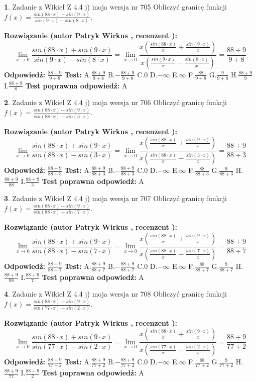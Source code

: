 \documentclass[12pt, a4paper]{article}
\theoremstyle{definition} %
\newtheorem{zad}{}
\newcommand{\zadStart}[1]{\begin{zad}#1\newline}
\newcommand{\zadStop}{\end{zad}}
\newcommand{\rozwStart}[2]{\noindent \textbf{Rozwiązanie (autor #1 , recenzent #2): }\newline}
\newcommand{\rozwStop}{\newline}
\newcommand{\odpStart}{\noindent \textbf{Odpowiedź:}\newline}
\newcommand{\odpStop}{\newline}
\newcommand{\testStart}{\noindent \textbf{Test:}\newline}
\newcommand{\testStop}{\newline}
\newcommand{\kluczStart}{\noindent \textbf{Test poprawna odpowiedź:}\newline}
\newcommand{\kluczStop}{\newline}
\begin{document}
\zadStart{Zadanie z Wikieł Z 4.4 j) moja wersja nr 705}
Obliczyć granicę funkcji $f(x)=\frac{sin(88\cdot x) +sin(9\cdot x)}{sin(9\cdot x) -sin(8\cdot x)}$.
\zadStop
\rozwStart{Patryk Wirkus}{}
$$\lim\limits_{x\to 0}\frac{sin(88\cdot x) +sin(9\cdot x)}{sin(9\cdot x) -sin(8\cdot x)}=\lim\limits_{x\to 0}\frac{x(\frac{sin(88\cdot x)}{x}+\frac{sin(9\cdot x)}{x})}{x(\frac{sin(9\cdot x)}{x}-\frac{sin(8\cdot x)}{x})}=\frac{88+9}{9+8}$$
\rozwStop
\odpStart
$\frac{88+9}{9+8}$
\odpStop
\testStart
A.$\frac{88+9}{9+8}$
B.$-\frac{88+9}{9+8}$
C.$0$
D.$-\infty$
E.$\infty$
F.$\frac{88}{9+8}$
G.$\frac{9}{9+8}$
H.$\frac{88+9}{9}$
I.$\frac{88+9}{8}$
\testStop
\kluczStart
A
\kluczStop



\zadStart{Zadanie z Wikieł Z 4.4 j) moja wersja nr 706}
Obliczyć granicę funkcji $f(x)=\frac{sin(88\cdot x) +sin(9\cdot x)}{sin(88\cdot x) -sin(3\cdot x)}$.
\zadStop
\rozwStart{Patryk Wirkus}{}
$$\lim\limits_{x\to 0}\frac{sin(88\cdot x) +sin(9\cdot x)}{sin(88\cdot x) -sin(3\cdot x)}=\lim\limits_{x\to 0}\frac{x(\frac{sin(88\cdot x)}{x}+\frac{sin(9\cdot x)}{x})}{x(\frac{sin(88\cdot x)}{x}-\frac{sin(3\cdot x)}{x})}=\frac{88+9}{88+3}$$
\rozwStop
\odpStart
$\frac{88+9}{88+3}$
\odpStop
\testStart
A.$\frac{88+9}{88+3}$
B.$-\frac{88+9}{88+3}$
C.$0$
D.$-\infty$
E.$\infty$
F.$\frac{88}{88+3}$
G.$\frac{9}{88+3}$
H.$\frac{88+9}{88}$
I.$\frac{88+9}{3}$
\testStop
\kluczStart
A
\kluczStop



\zadStart{Zadanie z Wikieł Z 4.4 j) moja wersja nr 707}
Obliczyć granicę funkcji $f(x)=\frac{sin(88\cdot x) +sin(9\cdot x)}{sin(88\cdot x) -sin(7\cdot x)}$.
\zadStop
\rozwStart{Patryk Wirkus}{}
$$\lim\limits_{x\to 0}\frac{sin(88\cdot x) +sin(9\cdot x)}{sin(88\cdot x) -sin(7\cdot x)}=\lim\limits_{x\to 0}\frac{x(\frac{sin(88\cdot x)}{x}+\frac{sin(9\cdot x)}{x})}{x(\frac{sin(88\cdot x)}{x}-\frac{sin(7\cdot x)}{x})}=\frac{88+9}{88+7}$$
\rozwStop
\odpStart
$\frac{88+9}{88+7}$
\odpStop
\testStart
A.$\frac{88+9}{88+7}$
B.$-\frac{88+9}{88+7}$
C.$0$
D.$-\infty$
E.$\infty$
F.$\frac{88}{88+7}$
G.$\frac{9}{88+7}$
H.$\frac{88+9}{88}$
I.$\frac{88+9}{7}$
\testStop
\kluczStart
A
\kluczStop



\zadStart{Zadanie z Wikieł Z 4.4 j) moja wersja nr 708}
Obliczyć granicę funkcji $f(x)=\frac{sin(88\cdot x) +sin(9\cdot x)}{sin(77\cdot x) -sin(2\cdot x)}$.
\zadStop
\rozwStart{Patryk Wirkus}{}
$$\lim\limits_{x\to 0}\frac{sin(88\cdot x) +sin(9\cdot x)}{sin(77\cdot x) -sin(2\cdot x)}=\lim\limits_{x\to 0}\frac{x(\frac{sin(88\cdot x)}{x}+\frac{sin(9\cdot x)}{x})}{x(\frac{sin(77\cdot x)}{x}-\frac{sin(2\cdot x)}{x})}=\frac{88+9}{77+2}$$
\rozwStop
\odpStart
$\frac{88+9}{77+2}$
\odpStop
\testStart
A.$\frac{88+9}{77+2}$
B.$-\frac{88+9}{77+2}$
C.$0$
D.$-\infty$
E.$\infty$
F.$\frac{88}{77+2}$
G.$\frac{9}{77+2}$
H.$\frac{88+9}{77}$
I.$\frac{88+9}{2}$
\testStop
\kluczStart
A
\kluczStop
\end{document}
